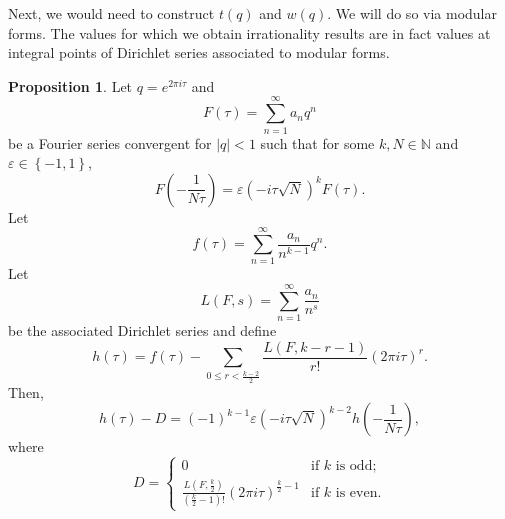 \documentclass[12pt, a4paper]{amsart}
\theoremstyle{definition}
\numberwithin{theorem}{section}
\newtheorem{proposition}[theorem]{Proposition}
\begin{document}
Next, we would need to construct $t\left(q\right)$ and $w\left(q\right)$. We will do so via modular forms. The values for which we obtain irrationality results are in fact values at integral points of Dirichlet series associated to modular forms.
\begin{proposition}\label{prop: h formula in terms of d}
Let $q=e^{2\pi i\tau}$ and \[F\left(\tau\right)=\sum_{n=1}^{\infty}a_nq^n\] be a Fourier series convergent for $\left|q\right|<1$ such that for some $k,N\in\mathbb{N}$ and $\varepsilon\in\left\{-1,1\right\}$, \[F\left(-\frac{1}{N\tau}\right)=\varepsilon\left(-i\tau\sqrt{N}\right)^kF\left(\tau\right).\] Let \[f\left(\tau\right)=\sum_{n=1}^{\infty}\frac{a_n}{n^{k-1}}q^n.\] Let \[L\left(F,s\right)=\sum_{n=1}^{\infty}\frac{a_n}{n^s}\] be the associated Dirichlet series and define \[h\left(\tau\right)=f\left(\tau\right)-\sum_{0\le r<\frac{k-2}{2}}\frac{L\left(F,k-r-1\right)}{r!}\left(2\pi i\tau\right)^r.\] Then, \[h\left(\tau\right)-D=\left(-1\right)^{k-1}\varepsilon\left(-i\tau\sqrt{N}\right)^{k-2}h\left(-\frac{1}{N\tau}\right),\] where \[D=\begin{cases}0&\text{if $k$ is odd};\\[4pt]\displaystyle\frac{L\left(F,\frac{k}{2}\right)}{\left(\frac{k}{2}-1\right)!}\left(2\pi i\tau\right)^{\frac{k}{2}-1}&\text{if $k$ is even}.\end{cases}\]
\end{proposition}
\end{document}

